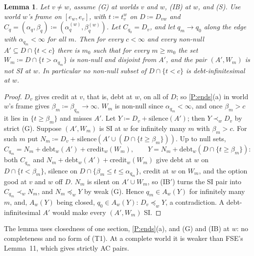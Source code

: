 \documentclass[11pt]{article}
\newtheorem{lemma}[theorem]{Lemma}
\theoremstyle{definition}\newtheorem{definition}[theorem]{Definition}
\theoremstyle{remark}\newtheorem{remark}[theorem]{Remark}
\newcommand{\debt}{\mathrm{debt}}
\newcommand{\cred}{\mathrm{credit}}
\newcommand{\sil}{\mathrm{silence}}
\begin{document}
\begin{lemma}\label{lem:SACo}
Let $v\ne w$, assume (G) at worlds $v$ and $w$, (IB) at $w$, and (S). Use
world $w$'s frame on $[e_w,e_v]$, with $t\coloneqq t^w_v$ on $D\coloneqq
D_{vw}$ and $C_q=(\alpha_q,\beta_q)\coloneqq(\alpha^{(w)}_q,\beta^{(w)}_q)$.
Let $C_{q_0}=D_v$, and let $q_m\to q_0$ along the edge with
$\alpha_{q_m}<\infty$ for all $m$. Then for every $c<\infty$ and every
non-null $A'\subseteq D\cap\{t<c\}$ there is $m_0$ such that for every
$m\ge m_0$ the set $W_m\coloneqq D\cap\{t>\alpha_{q_m}\}$ is non-null and
disjoint from $A'$, and the pair $(A',W_m)$ is not SI at $w$. In particular
no non-null subset of $D\cap\{t<c\}$ is debt-infinitesimal at $w$.
\end{lemma}
\begin{proof}
$D_v$ gives credit at $v$, that is, debt at $w$, on all of $D$; so
\ref{P:ends}(a) in world $w$'s frame gives $\beta_m\coloneqq\beta_{q_m}\to
\infty$. $W_m$ is non-null since $\alpha_{q_m}<\infty$, and once
$\beta_m>c$ it lies in $\{t\ge\beta_m\}$ and misses $A'$. Let $Y\coloneqq
D_v+\sil(A')$; then $Y\prec_wD_v$ by strict (G). Suppose $(A',W_m)$ is SI at
$w$ for infinitely many $m$ with $\beta_m>c$. For such $m$ put
$N_m\coloneqq D_v+\sil(A'\cup(D\cap\{t\ge\beta_m\}))$. Up to null sets,
\[
 C_{q_m}=N_m+\debt_w(A')+\cred_w(W_m),\qquad
 Y=N_m+\debt_w(D\cap\{t\ge\beta_m\}):
\]
both $C_{q_m}$ and $N_m+\debt_w(A')+\cred_w(W_m)$ give debt at $w$ on
$D\cap\{t<\beta_m\}$, silence on $D\cap\{\beta_m\le t\le\alpha_{q_m}\}$,
credit at $w$ on $W_m$, and the option good at $v$ and $w$ off $D$. $N_m$ is
silent on $A'\cup W_m$, so (IB$'$) turns the SI pair into
$C_{q_m}\prec_wN_m$, and $N_m\preceq_wY$ by weak (G). Hence $q_m\in A_w(Y)$
for infinitely many $m$, and, $A_w(Y)$ being closed, $q_0\in A_w(Y)$:
$D_v\preceq_wY$, a contradiction. A debt-infinitesimal $A'$ would make every
$(A',W_m)$ SI.
\end{proof}

The lemma uses closedness of one section, \ref{P:ends}(a), and (G) and (IB)
at $w$: no completeness and no form of (T1). At a complete world it is
weaker than FSE's Lemma~11, which gives strictly AC pairs.
\end{document}
